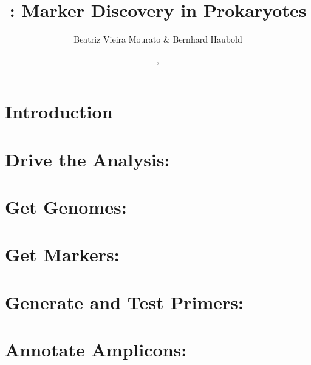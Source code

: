 \documentclass[a4paper]{report}
\begin{document}
\pagestyle{noweb}

\title{: Marker Discovery in Prokaryotes}
\author{Beatriz Vieira Mourato \& Bernhard Haubold}
\date{\!\!, }
\maketitle

\tableofcontents

\chapter{Introduction}

\chapter{Drive the Analysis: }

\chapter{Get Genomes: }

\chapter{Get Markers: }

\chapter{Generate and Test Primers: }

\chapter{Annotate Amplicons: }



\end{document}
